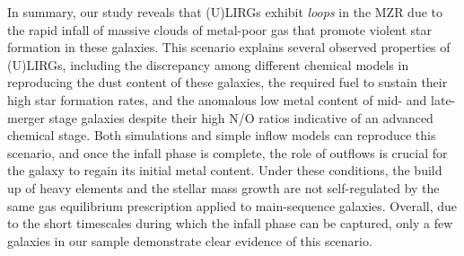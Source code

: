 \documentclass{nature2}
\begin{document}
In summary, our study reveals that (U)LIRGs exhibit {\it loops} in the MZR due to the rapid infall of massive clouds of metal-poor gas that promote violent star formation in these galaxies. This scenario explains several observed properties of (U)LIRGs, including the discrepancy among different chemical models in reproducing the dust content of these galaxies, the required fuel to sustain their high star formation rates, and the anomalous low metal content of mid- and late-merger stage galaxies %
despite their high N/O ratios indicative of an advanced chemical stage. Both simulations and simple inflow models can reproduce this scenario, and once the infall phase is complete, the role of outflows is crucial for the galaxy to regain its initial metal content. Under these conditions, the build up of heavy elements and the stellar mass growth are not self-regulated by the same gas equilibrium prescription applied to main-sequence galaxies. Overall, due to the short timescales during which the infall phase can be captured, only a few galaxies in our sample demonstrate clear evidence of this scenario.

\newpage

\clearpage
\newpage
\end{document}
